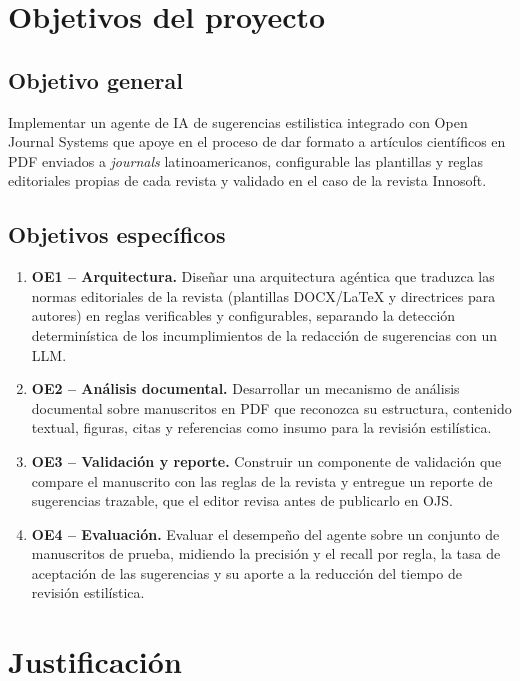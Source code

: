 \section{Objetivos del proyecto}

\subsection{Objetivo general}

Implementar un agente de IA de sugerencias estilistica integrado con Open Journal Systems que apoye en el proceso de dar formato a artículos científicos en PDF enviados a \emph{journals} latinoamericanos, configurable las plantillas y reglas editoriales propias de cada revista y validado en el caso de la revista Innosoft.

\subsection{Objetivos específicos}

\begin{enumerate}
  \item \textbf{OE1 -- Arquitectura.} Diseñar una arquitectura agéntica que traduzca las normas editoriales de la revista (plantillas DOCX/LaTeX y directrices para autores) en reglas verificables y configurables, separando la detección determinística de los incumplimientos de la redacción de sugerencias con un LLM.
  \item \textbf{OE2 -- Análisis documental.} Desarrollar un mecanismo de análisis documental sobre manuscritos en PDF que reconozca su estructura, contenido textual, figuras, citas y referencias como insumo para la revisión estilística.
  \item \textbf{OE3 -- Validación y reporte.} Construir un componente de validación que compare el manuscrito con las reglas de la revista y entregue un reporte de sugerencias trazable, que el editor revisa antes de publicarlo en OJS.
  \item \textbf{OE4 -- Evaluación.} Evaluar el desempeño del agente sobre un conjunto de manuscritos de prueba, midiendo la precisión y el recall por regla, la tasa de aceptación de las sugerencias y su aporte a la reducción del tiempo de revisión estilística.
\end{enumerate}

\section{Justificación}

